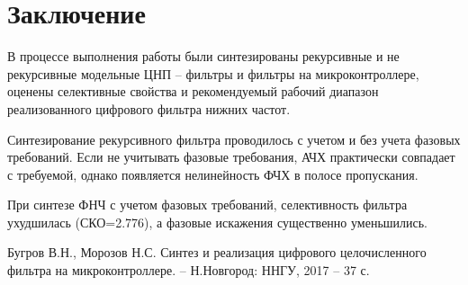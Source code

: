 \documentclass[a4paper,14pt]{extarticle}
\begin{document}
\section*{Заключение}

В процессе выполнения работы были синтезированы рекурсивные и не рекурсивные модельные  ЦНП – фильтры и фильтры на микроконтроллере, оценены селективные свойства и рекомендуемый рабочий диапазон реализованного цифрового фильтра нижних частот.

Синтезирование рекурсивного фильтра проводилось с учетом и без учета фазовых требований. Если не учитывать фазовые требования, АЧХ практически совпадает с требуемой, однако появляется нелинейность ФЧХ в полосе пропускания. 

При синтезе ФНЧ с учетом фазовых требований, селективность фильтра ухудшилась (СКО=2.776), а фазовые искажения существенно уменьшились.

\begin{thebibliography}{}

   Бугров В.Н., Морозов Н.С. Синтез и реализация цифрового целочисленного фильтра на микроконтроллере. -- Н.Новгород: ННГУ, 2017 -- 37 с.
\end{thebibliography}
\end{document}

